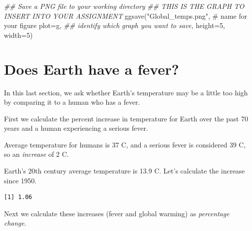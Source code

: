 \documentclass[
  letterpaper,
  DIV=11,
  numbers=noendperiod]{scrreprt}
\newenvironment{Shaded}{\begin{snugshade}}{\end{snugshade}}
\newcommand{\AttributeTok}[1]{\textcolor[rgb]{0.40,0.45,0.13}{#1}}
\newcommand{\CommentTok}[1]{\textcolor[rgb]{0.37,0.37,0.37}{#1}}
\newcommand{\DecValTok}[1]{\textcolor[rgb]{0.68,0.00,0.00}{#1}}
\newcommand{\DocumentationTok}[1]{\textcolor[rgb]{0.37,0.37,0.37}{\textit{#1}}}
\newcommand{\FunctionTok}[1]{\textcolor[rgb]{0.28,0.35,0.67}{#1}}
\newcommand{\NormalTok}[1]{\textcolor[rgb]{0.00,0.23,0.31}{#1}}
\newcommand{\OtherTok}[1]{\textcolor[rgb]{0.00,0.23,0.31}{#1}}
\newcommand{\SpecialCharTok}[1]{\textcolor[rgb]{0.37,0.37,0.37}{#1}}
\newcommand{\StringTok}[1]{\textcolor[rgb]{0.13,0.47,0.30}{#1}}
\begin{document}
\begin{Shaded}
\begin{Highlighting}[]
\DocumentationTok{\#\# Save a PNG file to your working directory}
\DocumentationTok{\#\# THIS IS THE GRAPH TO INSERT INTO YOUR ASSIGNMENT}
\FunctionTok{ggsave}\NormalTok{(}\StringTok{"Global\_temps.png"}\NormalTok{, }\CommentTok{\# name for your figure}
       \AttributeTok{plot=}\NormalTok{g, }\DocumentationTok{\#\# identify which graph you want to save,}
       \AttributeTok{height=}\DecValTok{5}\NormalTok{, }\AttributeTok{width=}\DecValTok{5}\NormalTok{)}
\end{Highlighting}
\end{Shaded}

\section{Does Earth have a fever?}\label{does-earth-have-a-fever}

In this last section, we ask whether Earth's temperature may be a little
too high by comparing it to a human who has a fever.

First we calculate the percent increase in temperature for Earth over
the past 70 years and a human experiencing a serious fever.

Average temperature for humans is 37 C, and a serious fever is
considered 39 C, so an \emph{increase} of 2 C.

Earth's 20th century average temperature is 13.9 C. Let's calculate the
increase since 1950.

\begin{Shaded}
\end{Shaded}

\begin{verbatim}
[1] 1.06
\end{verbatim}

Next we calculate these increases (fever and global warming) as
\emph{percentage change}.
\end{document}
